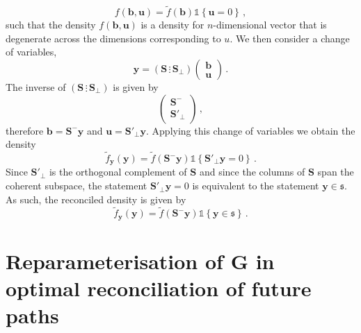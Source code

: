 \documentclass[12pt]{article}
\theoremstyle{definition}
\begin{document}
\begin{equation}
f(\bm{b},\bm{u})=\tilde{f}(\bm{b})\mathbb{1}\left\{\bm{u}=0\right\}\,,
\label{eq:densb}
\end{equation}
such that the density $f(\bm{b},\bm{u})$ is a density for $n$-dimensional vector that is degenerate across the dimensions corresponding to $u$.  We then consider a change of variables,
\[
\bm{y}=\left(\bm{S}\,\vdots\,\bm{S}_{\perp}\right)\begin{pmatrix}\bm{b}\\\bm{u}
\end{pmatrix}\,.
\] 
The inverse of $\left(\bm{S}\,\vdots\,\bm{S}_{\perp}\right)$ is given by
\[
\begin{pmatrix}\bm{S}^{-}\\\bm{S}'_{\perp}\end{pmatrix}\,,
\] 
therefore $\bm{b}=\bm{S}^-\bm{y}$ and $\bm{u}=\bm{S}'_\perp\bm{y}$.  Applying this change of variables we obtain the density
\[
\tilde{f}_{\bm{y}}(\bm{y})=\tilde{f}(\bm{S}^-\bm{y})\mathbb{1}\left\{\bm{S}'_\perp\bm{y}=0\right\}\,.
\]
Since $\bm{S}'_\perp$ is the orthogonal complement of $\bm{S}$ and since the columns of $\bm{S}$ span the coherent subspace, the statement $\bm{S}'_\perp\bm{y}=0$ is equivalent to the statement $\bm{y}\in\mathfrak{s}$.  As such, the reconciled density is given by
\[
\tilde{f}_{\bm{y}}(\bm{y})=\tilde{f}(\bm{S}^-\bm{y})\mathbb{1}\left\{\bm{y}\in\mathfrak{s}\right\}\,.
\]

\section{Reparameterisation of $\bm{G}$ in optimal reconciliation of future paths} \label{Appen:ReparaG}
\end{document}
